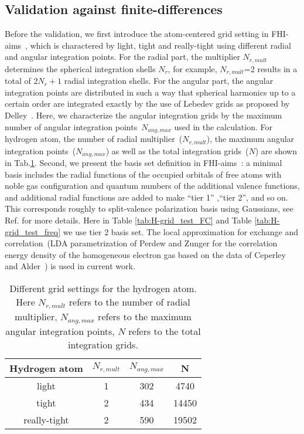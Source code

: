 \documentclass[journal=jpca,manuscript=article]{achemso}
\begin{document}
\subsection{Validation against finite-differences}
\label{subsec:validation}
Before the validation,  we first introduce the atom-centered grid setting in FHI-aims~\cite{Blum2009}, which is charactered by light, tight and really-tight using different radial and angular integration points. For the 
radial part, the multiplier $N_{r,mult}$ determines the 
 spherical integration shells $N_r$, for example, $N_{r,mult}$=2 results in a total of $2N_{r} +1$ radial integration shells. For the  angular part, the angular integration points are distributed in such a way that spherical harmonics up to a certain order are integrated exactly by the use of Lebedev grids as proposed by Delley~\cite{Delley-aug}. Here, we characterize the angular integration grids by the maximum number of angular integration points~$N_{ang,max}$ used in the calculation. For hydrogen atom, the number of radial multiplier~($N_{r,mult}$), the maximum angular integration points~($N_{ang,max}$) as well as the total integration grids~($N$) are shown in Tab.\ref{tab:H-grid}.
Second, we present the basis set definition in FHI-aims~\cite{Blum2009}: a minimal basis includes the radial functions of the occupied orbitals of free atoms with noble gas configuration and quantum numbers of the additional valence functions,  and additional radial functions are added to make ``tier 1'' ,``tier 2'', and so on. This corresponds roughly to split-valence polarization basis using Gaussians, see Ref.\cite{Blum2009} for more details. Here in Table \ref{tab:H-grid_test_FC} and Table \ref{tab:H-grid_test_freq} we use tier 2 basis set. The local approximation for exchange and correlation~(LDA parametrization of Perdew and Zunger \cite{Perdew/Zunger:1981} for the correlation 
energy density of the homogeneous electron gas based on the data of Ceperley and 
Alder~\cite{Ceperley/Alder:1980}) is used in current work.

\begin{table}
\begin{tabular}{c|ccc}
\hline \hline
 Hydrogen atom  &   $N_{r,mult}$ & $N_{ang,max}$ & N  \\
             \hline          
light        &  1             & 302    & 4740    \\
tight        &  2             & 434    & 14450    \\   
really-tight &  2             & 590    & 19502   \\
\hline \hline
\end{tabular}
\caption{Different grid settings for the hydrogen atom. Here $N_{r,mult}$ refers to the number of radial multiplier, $N_{ang,max}$ refers to  the maximum angular integration points, $N$ refers to the total integration grids. }
\label{tab:H-grid}
\end{table} 
\end{document}
